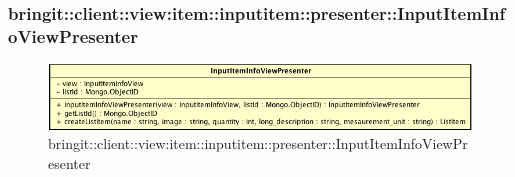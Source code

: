 \subsubsection{bringit::client::view:item::inputitem::presenter::InputItemInfoViewPresenter}

\label{bringit::client::view:item::inputitem::presenter::InputItemInfoViewPresenter}
\begin{figure}[H]
	\centering
	\includegraphics[scale=0.5]{Sezioni/SottosezioniST/img/app/InputItemInfoViewPresenter.png}
	\caption{bringit::client::view:item::inputitem::presenter::InputItemInfoViewPresenter}
\end{figure}

